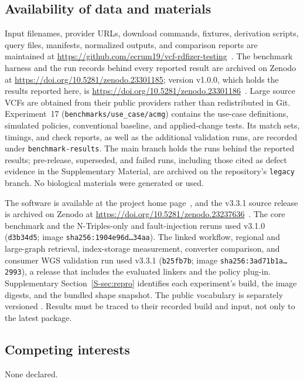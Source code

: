 \documentclass[pdflatex,sn-mathphys-num,referee]{sn-jnl}
\begin{document}
\subsection*{Availability of data and materials}
Input filenames, provider URLs, download commands, fixtures, derivation scripts, query files, manifests, normalized outputs, and comparison reports are maintained at \url{https://github.com/ecrum19/vcf-rdfizer-testing}~\cite{vcfrdfizer_testing_repo}.
The benchmark harness and the run records behind every reported result are archived on Zenodo at \url{https://doi.org/10.5281/zenodo.23301185}; version v1.0.0, which holds the results reported here, is \url{https://doi.org/10.5281/zenodo.23301186}~\cite{vcfrdfizer_testing_zenodo}.
Large source VCFs are obtained from their public providers rather than redistributed in Git.
Experiment~17 (\texttt{benchmarks/use\_case/acmg}) contains the use-case definitions, simulated policies, conventional baseline, and applied-change tests.
Its match sets, timings, and check reports, as well as the additional validation runs, are recorded under \texttt{benchmark-results}.
The main branch holds the runs behind the reported results; pre-release, superseded, and failed runs, including those cited as defect evidence in the Supplementary Material, are archived on the repository's \texttt{legacy} branch.
No biological materials were generated or used.

The software is available at the project home page~\cite{vcfrdfizer_repo}, and the v3.3.1 source release is archived on Zenodo at \url{https://doi.org/10.5281/zenodo.23237636}~\cite{vcfrdfizer_v331}.
The core benchmark and the N-Triples-only and fault-injection reruns used v3.1.0 (\texttt{d3b34d5}; image \texttt{sha256:1904e96d\ldots34aa}).
The linked workflow, regional and large-graph retrieval, index-storage measurement, converter comparison, and consumer WGS validation run used v3.3.1 (\texttt{b25fb7b}; image \texttt{sha256:3ad71b1a\ldots2993}), a release that includes the evaluated linkers and the policy plug-in.
Supplementary Section~\ref{S-sec:repro} identifies each experiment's build, the image digests, and the bundled shape snapshot.
The public vocabulary is separately versioned \cite{vcfc210}.
Results must be traced to their recorded build and input, not only to the latest package.

\subsection*{Competing interests}
None declared.
\end{document}
